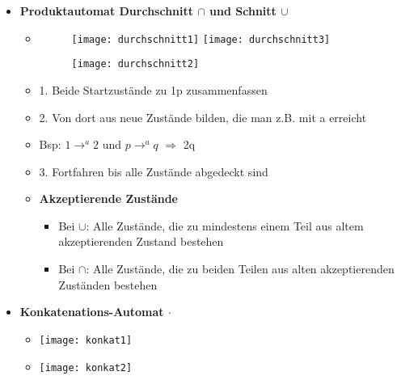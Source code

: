 \begin{itemize}

\item {\large \textbf{Produktautomat Durchschnitt $\cap$ und Schnitt $\cup$}}
	\begin{itemize}
	
	\item[]
		\begin{minipage}{0.4\textwidth}
				\begin{figure}[H]
				\texttt{[image: durchschnitt1]}
				\texttt{[image: durchschnitt3]}
				\end{figure}
			\end{minipage}
			\begin{minipage}[t]{0.4\textwidth}
				\vspace{-3cm}
				\begin{figure}[H]
				\texttt{[image: durchschnitt2]}
				\end{figure}
			\end{minipage}
	\item 1. Beide Startzustände zu 1p zusammenfassen
	\item 2. Von dort aus neue Zustände bilden, die man z.B. mit a erreicht
	\item Bsp: $1 \rightarrow^a 2$ und $p \rightarrow^a q$ $\Rightarrow$ 2q
	\item 3. Fortfahren bis alle Zustände abgedeckt sind
	\item \textbf{Akzeptierende Zustände}
		\begin{itemize}
		\item Bei $\cup$: Alle Zustände, die zu mindestens einem Teil aus altem akzeptierenden Zustand bestehen
		\item Bei $\cap$: Alle Zustände, die zu beiden Teilen aus alten akzeptierenden Zuständen bestehen
		\end{itemize}
	
	\end{itemize}
	
\item {\large \textbf{Konkatenations-Automat $\cdot$}}
	\begin{itemize}
	
	\item[]
		\begin{center}
		\texttt{[image: konkat1]}
		\end{center}			
	
	\item[]
		\begin{center}
		\texttt{[image: konkat2]}
		\end{center}	
	

\end{itemize}
\end{itemize}
